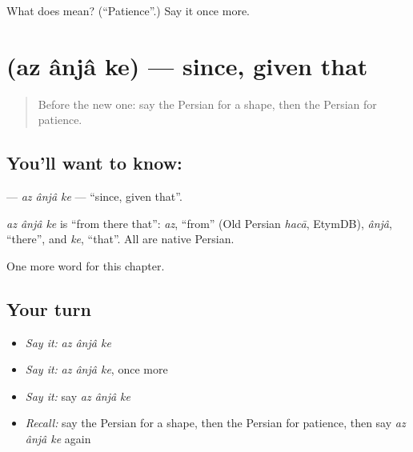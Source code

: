 \begin{tcolorbox}[breakable,colback=teal!4,colframe=teal!35!black,title={Before you move on}]
What does  mean? (\textquotedblleft{}Patience\textquotedblright{}.) Say it once more.
\end{tcolorbox}
\section[\texorpdfstring{\fa{از} \fa{آنجا} \fa{که} (az ânjâ ke)}{از آنجا که (az ânjâ ke)}]{   (az ânjâ ke) — since, given that}

\label{lesson:FA-C270-az-anja-ke}



\begin{quote}
Before the new one: say the Persian for a shape, then the Persian for patience.
\end{quote}

\subsection*{You'll want to know:   }
\textbf{  } — \emph{az ânjâ ke} — \textquotedblleft{}since, given that\textquotedblright{}.

\begin{cousinweb}
\emph{az ânjâ ke} is \textquotedblleft{}from there that\textquotedblright{}: \emph{az}, \textquotedblleft{}from\textquotedblright{} (Old Persian \emph{hacā}, EtymDB), \emph{ânjâ}, \textquotedblleft{}there\textquotedblright{}, and \emph{ke}, \textquotedblleft{}that\textquotedblright{}. All are native Persian.
\end{cousinweb}

\begin{grammarlens}[title={What you've built}]
One more word for this chapter.
\end{grammarlens}

\subsection*{Your turn}
\begin{itemize}
\raggedright
  \item \emph{Say it:} \emph{az ânjâ ke}
  \item \emph{Say it:} \emph{az ânjâ ke}, once more
  \item \emph{Say it:} say \emph{az ânjâ ke}
  \item \emph{Recall:} say the Persian for a shape, then the Persian for patience, then say \emph{az ânjâ ke} again
\end{itemize}

